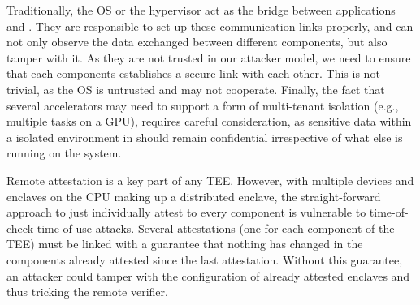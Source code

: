Traditionally, the OS or the hypervisor act as the bridge between applications and \sphw. They are responsible to set-up these communication links properly, and can not only observe the data exchanged between different components, but also tamper with it.
As they are not trusted in our attacker model, we need to ensure that each components establishes a secure link with each other. This is not trivial, as the OS is untrusted and may not cooperate. %
Finally, the fact that several accelerators may need to support a form of multi-tenant isolation (e.g., multiple tasks on a GPU), requires careful consideration, as sensitive data within a isolated environment in \name should remain confidential irrespective of what else is running on the system.



Remote attestation is a key part of any TEE. However, with multiple \sphw devices and enclaves on the CPU making up a distributed enclave, the straight-forward approach to just individually attest to every component is vulnerable to time-of-check-time-of-use attacks. Several attestations (one for each component of the TEE) must be linked with a guarantee that nothing has changed in the components already attested since the last attestation. Without this guarantee, an attacker could tamper with the configuration of already attested enclaves and thus tricking the remote verifier.



